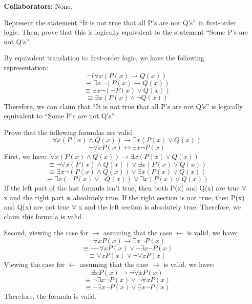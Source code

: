 \documentclass[12pt,twoside]{article}
\begin{document}
\textbf{Collaborators:}
None.
\begin{exercises}

\problem

Represent the statement ``It is not true that all P's are not Q's'' in
first-order logic. Then, prove that this is logically equivalent to the
statement ``Some P's are not Q's''.

\ifsolution \solution{}
By equivalent translation to first-order logic, we have the following
representation: $$\neg (\forall x(P(x) \rightarrow Q(x))$$
$$\equiv \exists x \neg (P(x) \rightarrow Q(x))$$
$$\equiv \exists x \neg ( \neg P(x) \vee Q(x))$$
$$\equiv \exists x (P(x) \wedge \neg Q(x))$$
Therefore, we can claim that ``It is not true that all P's are not Q's'' is logically equivalent to ``Some P's are not Q's''

\fi

\problem

Prove that the following formulas are valid:
$$\forall x (P(x) \wedge Q(x)) \rightarrow \exists x(P(x) \vee Q(x)) $$
$$\neg \forall x P(x) \leftrightarrow \exists x \neg P(x) $$
\ifsolution \solution{}
First, we have: $\forall x (P(x) \wedge Q(x)) \rightarrow \exists x(P(x) \vee Q(x)) $
$$\equiv \neg \forall x (P(x) \wedge Q(x))\vee \exists x (P(x) \vee Q(x)) $$
$$\equiv \exists x \neg (P(x) \wedge Q(x))\vee \exists x (P(x) \vee Q(x)) $$
$$ \equiv \exists x(\neg P(x) \vee \neg Q(x)) \vee \exists x (P(x) \vee Q(x)) $$
If the left part of the last formula isn't true, then both P(x) and Q(x) are true $\forall$ x and the right part is absolutely true. If the right section is not true, then P(x) and Q(x) are not true $\forall$ x and the left section is absolutely true. Therefore, we claim this formula is valid.

Second, viewing the case for $\rightarrow$ assuming that the case $\leftarrow$ is valid, we have:
$$\neg \forall x P(x) \rightarrow \exists x \neg P(x)$$
$$\equiv \neg \neg \forall x P(x) \vee \neg \exists x \neg P(x)$$
$$\equiv \forall x P(x) \vee \neg \forall x P(x) $$
Viewing the case for $\leftarrow$ assuming that the case $\rightarrow$ is valid, we have:
$$\exists x P(x) \rightarrow \neg \forall x P(x) $$
$$\equiv \neg \exists x \neg P(x) \vee \neg \forall x P(x)$$
$$\equiv \neg \exists x \neg P(x) \vee \exists x \neg P(x)$$
Therefore, the formula is valid.
\fi

\problem


\end{exercises}
\end{document}
